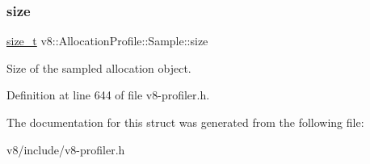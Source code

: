 \subsubsection{\texorpdfstring{size}{size}}
{\footnotesize\ttfamily \mbox{\hyperlink{classsize__t}{size\+\_\+t}} v8\+::\+Allocation\+Profile\+::\+Sample\+::size}

Size of the sampled allocation object. 

Definition at line 644 of file v8-\/profiler.\+h.



The documentation for this struct was generated from the following file\+:\begin{DoxyCompactItemize}
\item 
v8/include/v8-\/profiler.\+h\end{DoxyCompactItemize}
